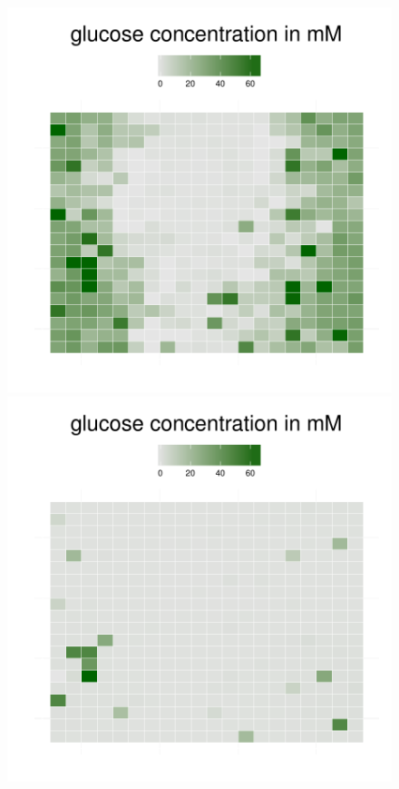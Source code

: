 \begin{figure}[h]
{\begin{minipage}[t]{0.3\textwidth}
  \end{minipage}
  \begin{minipage}[t]{0.3\textwidth}
    \includegraphics[width=\textwidth]{../results/ecoli_beijerinckii_20x20_seed5147_gluc55.pdf}
  \end{minipage}
  \begin{minipage}[t]{0.3\textwidth}
    \includegraphics[width=\textwidth]{../results/ecoli_beijerinckii_20x20_seed5147_gluc75.pdf}

\end{minipage}}
\end{figure}
